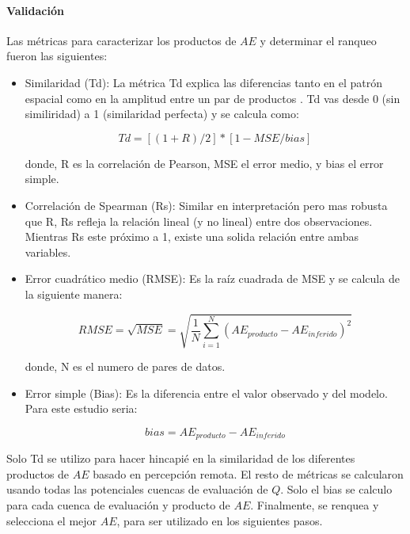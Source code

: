 \documentclass[12pt]{article}
\begin{document}
\paragraph{Validación}\mbox{}

Las métricas para caracterizar los productos de $AE$ y determinar el ranqueo fueron las siguientes:

\begin{itemize}

	\item Similaridad (Td): La métrica Td explica las diferencias tanto en el patrón espacial como en la amplitud entre un par de productos \citep{Tian2017}. Td vas desde 0 (sin similiridad) a 1 (similaridad perfecta) y se calcula como:
	
	\begin{equation}
    Td = [(1 + R) / 2]*[1 - MSE/bias]
    \end{equation}
    
    donde, R es la correlación de Pearson, MSE el error medio, y bias el error simple.
    

	\item Correlación de Spearman (Rs): Similar en interpretación pero mas robusta que R, Rs refleja la relación lineal (y no lineal) entre dos observaciones. Mientras Rs este próximo a 1, existe una solida relación entre ambas variables.
	
	\item Error cuadrático medio (RMSE): Es la raíz cuadrada de MSE y se calcula de la siguiente manera:
	
    \begin{equation}
        RMSE = \sqrt{MSE} = \sqrt{\frac{1}{N} \sum_{i=1}^{N}(AE_{producto}-AE_{inferido})^{2}}
    \end{equation}
    
    donde, N es el numero de pares de datos.
    
	\item Error simple (Bias): Es la diferencia entre el valor observado y del modelo. Para este estudio seria:
	
    \begin{equation}
        bias = AE_{producto}-AE_{inferido}
    \end{equation}
	
\end{itemize}

Solo Td se utilizo para hacer hincapié en la similaridad de los diferentes productos de $AE$ basado en percepción remota. El resto de métricas se calcularon usando todas las potenciales cuencas de evaluación de $Q$. Solo el bias se calculo para cada cuenca de evaluación y producto de $AE$. Finalmente, se renquea y selecciona el mejor $AE$, para ser utilizado en los siguientes pasos.
\end{document}
